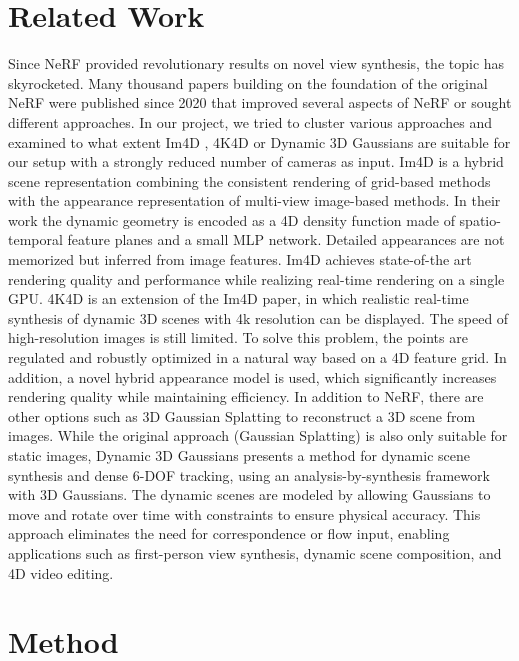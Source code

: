 \documentclass[conference]{IEEEtran}
\begin{document}
\section{Related Work}
Since NeRF \cite{b4} provided revolutionary results on novel view synthesis, the topic has skyrocketed.
Many thousand papers building on the foundation
of the original NeRF were published since 2020 that
improved several aspects of NeRF or sought different approaches. In our project, we tried to cluster various approaches and examined to what extent Im4D \cite{b3}, 4K4D \cite{b5} or Dynamic
3D Gaussians \cite{b2} are suitable for our setup
with a strongly reduced number of cameras as input.
Im4D \cite{b3} is a hybrid scene representation combining the consistent rendering of grid-based methods with the appearance representation of multi-view image-based methods. In their work the dynamic geometry is encoded as a 4D density function made of
spatio-temporal feature planes and a small MLP network. Detailed appearances are not memorized but inferred from image features. Im4D achieves state-of-the art rendering quality and performance while realizing
real-time rendering on a single GPU. 
4K4D \cite{b5} is an extension of the Im4D paper, in which realistic
real-time synthesis of dynamic 3D scenes with 4k resolution can be displayed. The speed of high-resolution
images is still limited. To solve this problem, the points
are regulated and robustly optimized in a natural way
based on a 4D feature grid. In addition, a novel hybrid
appearance model is used, which significantly increases
rendering quality while maintaining efficiency.
In addition to NeRF, there are other options such
as 3D Gaussian Splatting \cite{b1} to reconstruct a
3D scene from images. While the original approach (Gaussian Splatting) is
also only suitable for static images, Dynamic 3D Gaussians \cite{b2} presents a method for dynamic scene
synthesis and dense 6-DOF tracking, using an analysis-by-synthesis framework with 3D Gaussians. The dynamic scenes are modeled by allowing Gaussians to
move and rotate over time with constraints to ensure
physical accuracy. This approach eliminates the need
for correspondence or flow input, enabling applications
such as first-person view synthesis, dynamic scene composition, and 4D video editing.

\section{Method}
\end{document}
